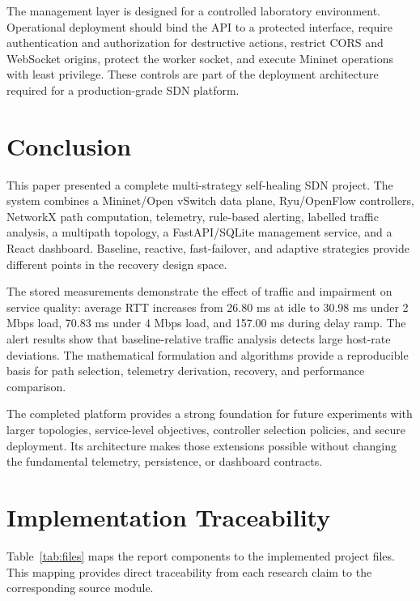 \documentclass[conference]{IEEEtran}
\begin{document}
The management layer is designed for a controlled laboratory environment.
Operational deployment should bind the API to a protected interface, require
authentication and authorization for destructive actions, restrict CORS and
WebSocket origins, protect the worker socket, and execute Mininet operations
with least privilege. These controls are part of the deployment architecture
required for a production-grade SDN platform.

\section{Conclusion}
\label{sec:conclusion}

This paper presented a complete multi-strategy self-healing SDN project. The
system combines a Mininet/Open vSwitch data plane, Ryu/OpenFlow controllers,
NetworkX path computation, telemetry, rule-based alerting, labelled traffic
analysis, a multipath topology, a FastAPI/SQLite management service, and a
React dashboard. Baseline, reactive, fast-failover, and adaptive strategies
provide different points in the recovery design space.

The stored measurements demonstrate the effect of traffic and impairment on
service quality: average RTT increases from 26.80 ms at idle to 30.98 ms
under 2 Mbps load, 70.83 ms under 4 Mbps load, and 157.00 ms during delay
ramp. The alert results show that baseline-relative traffic analysis detects
large host-rate deviations. The mathematical formulation and algorithms
provide a reproducible basis for path selection, telemetry derivation,
recovery, and performance comparison.

The completed platform provides a strong foundation for future experiments
with larger topologies, service-level objectives, controller selection
policies, and secure deployment. Its architecture makes those extensions
possible without changing the fundamental telemetry, persistence, or
dashboard contracts.

\appendices
\section{Implementation Traceability}
\label{app:traceability}

Table~\ref{tab:files} maps the report components to the implemented project
files. This mapping provides direct traceability from each research claim to
the corresponding source module.
\end{document}
